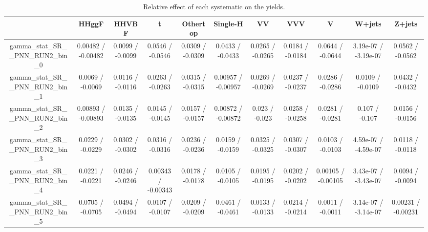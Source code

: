 \documentclass[10pt]{article}
\begin{document}
\begin{table}[htbp]
\begin{center}
\begin{tabular}{|c|c|c|c|c|c|c|c|c|c|c|}
\hline 
      & HHggF      & HHVBF      & t      & Othertop      & Single-H      & VV      & VVV      & V      & W+jets      & Z+jets \\ 
\hline 
  gamma_stat_SR__PNN_RUN2_bin_0 & 0.00482 / -0.00482 & 0.0099 / -0.0099 & 0.0546 / -0.0546 & 0.0309 / -0.0309 & 0.0433 / -0.0433 & 0.0265 / -0.0265 & 0.0184 / -0.0184 & 0.0644 / -0.0644 & 3.19e-07 / -3.19e-07 & 0.0562 / -0.0562 \\ 
  gamma_stat_SR__PNN_RUN2_bin_1 & 0.0069 / -0.0069 & 0.0116 / -0.0116 & 0.0263 / -0.0263 & 0.0315 / -0.0315 & 0.00957 / -0.00957 & 0.0269 / -0.0269 & 0.0237 / -0.0237 & 0.0286 / -0.0286 & 0.0109 / -0.0109 & 0.0432 / -0.0432 \\ 
  gamma_stat_SR__PNN_RUN2_bin_2 & 0.00893 / -0.00893 & 0.0135 / -0.0135 & 0.0145 / -0.0145 & 0.0157 / -0.0157 & 0.00872 / -0.00872 & 0.023 / -0.023 & 0.0258 / -0.0258 & 0.0281 / -0.0281 & 0.107 / -0.107 & 0.0156 / -0.0156 \\ 
  gamma_stat_SR__PNN_RUN2_bin_3 & 0.0229 / -0.0229 & 0.0302 / -0.0302 & 0.0316 / -0.0316 & 0.0236 / -0.0236 & 0.0159 / -0.0159 & 0.0325 / -0.0325 & 0.0307 / -0.0307 & 0.0103 / -0.0103 & 4.59e-07 / -4.59e-07 & 0.0118 / -0.0118 \\ 
  gamma_stat_SR__PNN_RUN2_bin_4 & 0.0221 / -0.0221 & 0.0246 / -0.0246 & 0.00343 / -0.00343 & 0.0178 / -0.0178 & 0.0105 / -0.0105 & 0.0195 / -0.0195 & 0.0202 / -0.0202 & 0.00105 / -0.00105 & 3.43e-07 / -3.43e-07 & 0.0094 / -0.0094 \\ 
  gamma_stat_SR__PNN_RUN2_bin_5 & 0.0705 / -0.0705 & 0.0494 / -0.0494 & 0.0107 / -0.0107 & 0.0209 / -0.0209 & 0.0461 / -0.0461 & 0.0133 / -0.0133 & 0.0214 / -0.0214 & 0.0011 / -0.0011 & 3.14e-07 / -3.14e-07 & 0.00231 / -0.00231 \\ 
\hline 
\end{tabular} 
\caption{Relative effect of each systematic on the yields.} 
\end{center} 
\end{table} 
\end{document}
